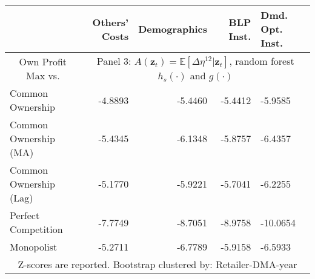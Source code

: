 \begin{tabular}{l r r r b }
\toprule
                        &  Others' Costs &  Demographics &  BLP Inst. &  Dmd. Opt. Inst. \\
\midrule
\multicolumn{1}{c}{Own Profit Max vs.}& \multicolumn{4}{c}{Panel 3: $A(\mathbf{z}_t) = \mathbb{E}[\Delta\eta^{12}|\mathbf{z}_t]$, random forest $h_s(\cdot)$ and $g(\cdot)$}\\
\cmidrule(lr){1-1} \cmidrule(lr){2-5}
      Common Ownership &        -4.8893 &       -5.4460 &    -5.4412 &          -5.9585 \\
  Common Ownership (MA) &        -5.4345 &       -6.1348 &    -5.8757 &          -6.4357 \\
 Common Ownership (Lag) &        -5.1770 &       -5.9221 &    -5.7041 &          -6.2255 \\
   Perfect Competition &       -7.7749 &       -8.7051 &   -8.9758 &         -10.0654 \\
Monopolist &        -5.2711 &        -6.7789 &   -5.9158 &          -6.5933 \\
\bottomrule
\multicolumn{5}{c}{Z-scores are reported. Bootstrap clustered by: Retailer-DMA-year}
\end{tabular}
